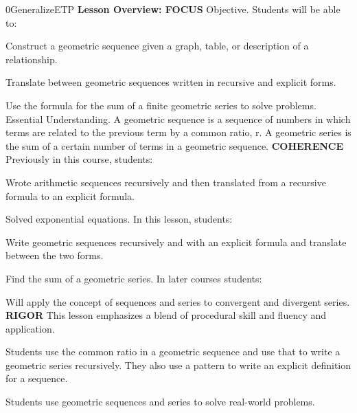 \documentclass{article}
\newenvironment{te-addendum}[2]{}{}     %
\begin{document}
\begin{te-addendum}{0}{GeneralizeETP}
\textbf{Lesson Overview: FOCUS}
Objective. Students will be able to:
\item Construct a geometric sequence given a graph, table, or description of a relationship.
\item Translate between geometric sequences written in recursive and explicit forms.
\item Use the formula for the sum of a finite geometric series to solve problems.
Essential Understanding. A geometric sequence is a sequence of numbers in which terms are related to the previous term by a common ratio, r. A geometric series is the sum of a certain number of terms in a geometric sequence.
\textbf{COHERENCE}
Previously in this course, students:
\item Wrote arithmetic sequences recursively and then translated from a recursive formula to an explicit formula.
\item Solved exponential equations.
In this lesson, students:
\item Write geometric sequences recursively and with an explicit formula and translate between the two forms.
\item Find the sum of a geometric series.
In later courses students:
\item Will apply the concept of sequences and series to convergent and divergent series.
\textbf{RIGOR}
This lesson emphasizes a blend of procedural skill and fluency and application.
\item Students use the common ratio in a geometric sequence and use that to write a geometric series recursively. They also use a pattern to write an explicit definition for a sequence.
\item Students use geometric sequences and series to solve real-world problems.
\end{te-addendum}
\end{document}
